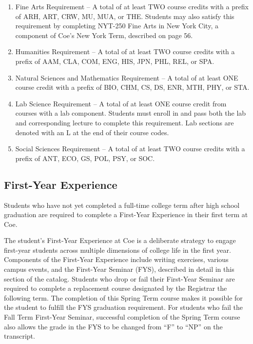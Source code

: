 \documentclass[
  letterpaper,
]{scrbook}
\providecommand{\tightlist}{%
  \setlength{\itemsep}{0pt}\setlength{\parskip}{0pt}}
\begin{document}
\begin{enumerate}
\def\labelenumi{\arabic{enumi}.}
\tightlist
\item
  Fine Arts Requirement -- A total of at least TWO course credits with a
  prefix of ARH, ART, CRW, MU, MUA, or THE. Students may also satisfy
  this requirement by completing NYT-250 Fine Arts in New York City, a
  component of Coe's New York Term, described on page 56.
\item
  Humanities Requirement -- A total of at least TWO course credits with
  a prefix of AAM, CLA, COM, ENG, HIS, JPN, PHL, REL, or SPA.
\item
  Natural Sciences and Mathematics Requirement -- A total of at least
  ONE course credit with a prefix of BIO, CHM, CS, DS, ENR, MTH, PHY, or
  STA.
\item
  Lab Science Requirement -- A total of at least ONE course credit from
  courses with a lab component. Students must enroll in and pass both
  the lab and corresponding lecture to complete this requirement. Lab
  sections are denoted with an L at the end of their course codes.
\item
  Social Sciences Requirement -- A total of at least TWO course credits
  with a prefix of ANT, ECO, GS, POL, PSY, or SOC.
\end{enumerate}

\subsection{First-Year Experience}\label{first-year-experience}

Students who have not yet completed a full-time college term after high
school graduation are required to complete a First-Year Experience in
their first term at Coe.

The student's First-Year Experience at Coe is a deliberate strategy to
engage first-year students across multiple dimensions of college life in
the first year. Components of the First-Year Experience include writing
exercises, various campus events, and the First-Year Seminar (FYS),
described in detail in this section of the catalog. Students who drop or
fail their First-Year Seminar are required to complete a replacement
course designated by the Registrar the following term. The completion of
this Spring Term course makes it possible for the student to fulfill the
FYS graduation requirement. For students who fail the Fall Term
First-Year Seminar, successful completion of the Spring Term course also
allows the grade in the FYS to be changed from ``F'' to ``NP'' on the
transcript.
\end{document}
